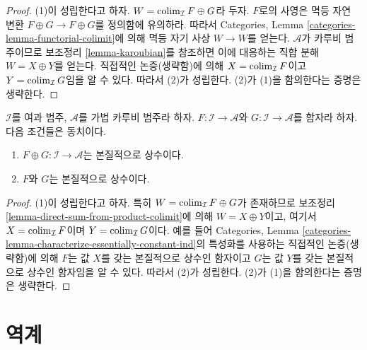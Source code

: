 \begin{proof}
(1)이 성립한다고 하자. $W = \mathop{\mathrm{colim}}\nolimits_\mathcal{I} F \oplus G$라 두자.
$F$로의 사영은 멱등 자연 변환 $F \oplus G \to F \oplus G$를 정의함에
유의하라.
따라서 Categories, Lemma
\ref{categories-lemma-functorial-colimit}에 의해 멱등 자기 사상
$W \to W$를 얻는다. $\mathcal{A}$가 카루비 범주이므로 보조정리
\ref{lemma-karoubian}를 참조하면 이에 대응하는 직합 분해
$W = X \oplus Y$를 얻는다. 직접적인 논증(생략함)에 의해
$X = \mathop{\mathrm{colim}}\nolimits_\mathcal{I} F$이고 $Y = \mathop{\mathrm{colim}}\nolimits_\mathcal{I} G$임을 알 수 있다.
따라서 (2)가 성립한다. (2)가 (1)을 함의한다는 증명은 생략한다.
\end{proof}

\begin{lemma}
\label{lemma-direct-sum-from-product-essentially-constant}
$\mathcal{I}$를 여과 범주, $\mathcal{A}$를 가법 카루비 범주라 하자.
$F : \mathcal{I} \to \mathcal{A}$와
$G : \mathcal{I} \to \mathcal{A}$를 함자라 하자. 다음 조건들은 동치이다.
\begin{enumerate}
\item $F \oplus G : \mathcal{I} \to \mathcal{A}$는 본질적으로 상수이다.
\item $F$와 $G$는 본질적으로 상수이다.
\end{enumerate}
\end{lemma}

\begin{proof}
(1)이 성립한다고 하자. 특히 $W = \mathop{\mathrm{colim}}\nolimits_\mathcal{I} F \oplus G$가
존재하므로 보조정리 \ref{lemma-direct-sum-from-product-colimit}에 의해
$W = X \oplus Y$이고, 여기서 $X = \mathop{\mathrm{colim}}\nolimits_\mathcal{I} F$이며
$Y = \mathop{\mathrm{colim}}\nolimits_\mathcal{I} G$이다. 예를 들어 Categories, Lemma
\ref{categories-lemma-characterize-essentially-constant-ind}의 특성화를
사용하는 직접적인 논증(생략함)에 의해 $F$는 값 $X$를 갖는 본질적으로
상수인 함자이고 $G$는 값 $Y$를 갖는 본질적으로 상수인 함자임을 알 수 있다.
따라서 (2)가 성립한다. (2)가 (1)을 함의한다는 증명은 생략한다.
\end{proof}




\section{역계}
\label{section-inverse-systems}

